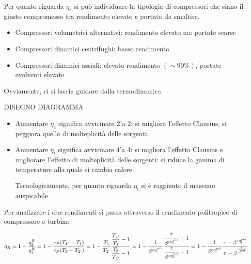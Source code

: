 \begin{adjustwidth}{2in}{}
	Per quanto riguarda $\eta_c$ si può individuare la tipologia di compressori che siano il giusto compromesso tra rendimento elevato e portata da smaltire. 
	\begin{itemize}
		\item Compressori volumetrici alternativi: rendimento elevato ma portate scarse
		\item Compressori dinamici centrifughi: basso rendimento
		\item Compressori dinamici assiali: elevato rendimento $(\sim90\%)$, portate evolventi elevate
	\end{itemize}
	Ovviamente, ci si lascia guidare dalla termodinamica
	
	DISEGNO DIAGRAMMA 
	
	\begin{itemize}
		\item Aumentare $\eta_c$ significa avvicinare 2'a 2: si migliora l'effetto Clausius, si peggiora quello di molteplicità delle sorgenti.
		\item Aumentare $\eta_t$ significa avvicinare 4'a 4: si migliora l'effetto Clausius e migliorare l'effetto di molteplicità delle sorgenti: si riduce la gamma di temperature alla quale si cambia calore. 
		
		Tecnologicamente, per quanto riguarda $\eta_t$ si è raggiunto il massimo auspicabile 
	\end{itemize}
	
	Per analizzare i due rendimenti si passa attraverso il rendimento politropico di compressore e turbina
\end{adjustwidth}
\vspace{1cm}
	\[\eta_R = 1-\dfrac{q_2^R}{q_1^R} = 1-\dfrac{c_P(T_{4'}-T_1)}{c_P(T_3-T_{2'})} = 1-\dfrac{T_1}{T_{2'}}\dfrac{\dfrac{T_{4'}}{T_1}-1}{\dfrac{T_3}{T_{2'}}-1} = 1-\dfrac{1}{\beta^{\varepsilon\eta_c^{pol}}}\dfrac{\dfrac{\tau}{\beta^{\varepsilon\eta_t^{pol}}}-1}{\dfrac{\tau}{\beta^{\varepsilon\eta_c^{pol}}}-1} = 1-\dfrac{1}{\beta^{\varepsilon\eta_c^{pol}}} \dfrac{\tau-\beta^{\varepsilon\eta_t^{pol}}}{\tau - \beta^{\varepsilon\over\eta_c^{pol}}}\]
\vspace{1cm}

